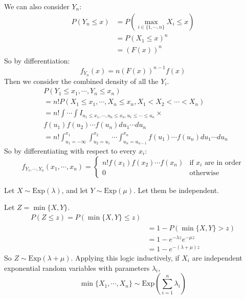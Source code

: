 \documentclass[../Main.tex]{subfiles}
\begin{document}
We can also consider $Y_n$:
\begin{align*}
    P(Y_n \leq x) &= P(\max_{i \in \{1, \cdots, n\}} X_i \leq x) \\
    &= P(X_1 \leq x)^n \\
    &= (F(x))^n
\end{align*}
So by differentiation:
\begin{equation*}
    f_{Y_n}(x) = n(F(x))^{n-1} f(x)
\end{equation*}
Then we consider the combined density of all the $Y_i$.
\begin{align*}
    &P(Y_1 \leq x_1, \cdots, Y_n \leq x_n) \\
    &= n! P(X_1 \leq x_1, \cdots, X_n \leq x_n, X_1 < X_2 < \cdots < X_n) \\
    &= n! \int \cdots \int I_{u_1 \leq x_1, \cdots, u_n \leq x_n, u_1 \leq \cdots \leq u_n} \times \\
    & f(u_1) f(u_2) \cdots f(u_n) du_1 \cdots du_n \\
    &= n! \int_{u_1 = -\infty}^{x_1} \int_{u_2 = u_1}^{x_2} \cdots \int_{u_n = u_{n - 1}}^{x_n} f(u_1) \cdots f(u_n) du_1 \cdots du_n
\end{align*}
So by differentiating with respect to every $x_i$:
\begin{equation*}
    f_{Y_1, \cdots, Y_n}(x_1, \cdots, x_n) =
    \begin{cases}
        n! f(x_1) f(x_2) \cdots f(x_n) & \text{if } x_i \text{ are in order} \\
        0 & \text{otherwise}
    \end{cases}
\end{equation*}
\begin{example}
    Let $X \sim \text{Exp}(\lambda)$, and let $Y \sim \text{Exp}(\mu)$. Let them be independent.

    Let $Z = \min\{X, Y\}$.
    \begin{align*}
        P(Z \leq z) = P(\min\{X, Y\} \leq z) \\
        &= 1 - P(\min\{X, Y\} > z) \\
        &= 1 - e^{-\lambda z} e^{-\mu z} \\
        &= 1 - e^{-(\lambda + \mu) z}
    \end{align*}
    So $Z \sim \text{Exp}(\lambda + \mu)$. Applying this logic inductively, if $X_i$ are independent exponential random variables with parameters $\lambda_i$,
    \begin{equation*}
        \min\{X_1, \cdots, X_n\} \sim \text{Exp}\left(\sum_{i = 1}^n \lambda_i\right)
    \end{equation*}
\end{example}
\end{document}
